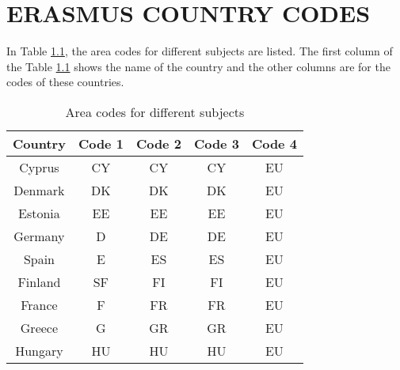 \chapter{ERASMUS COUNTRY CODES}

In Table \ref{tab:tableArea}, the area codes for different subjects are listed. The first column of the Table \ref{tab:tableArea} shows the name of the country and the other columns are for the codes of these countries.  
\begin{table}[!ht]
\caption{Area codes for different subjects}
\label{tab:tableArea}

\centering
\begin{tabular}{|c|c|c|c|c|}
\hline
\textbf{Country} & \textbf{Code 1} & \textbf{Code 2} & \textbf{Code 3} & \textbf{Code 4}                                                     \\ \hline
Cyprus           & CY              & CY              & CY              & EU                                                                  \\ \hline
Denmark          & DK              & DK              & DK              & EU                                                                  \\ \hline
Estonia          & EE              & EE              & EE              & EU                                                                  \\ \hline
Germany          & D               & DE              & DE              & EU                                                                  \\ \hline
Spain            & E               & ES              & ES              & EU                                                                  \\ \hline
Finland          & SF              & FI              & FI              & EU                                                                  \\ \hline
France           & F               & FR              & FR              & EU                                                                  \\ \hline
Greece           & G               & GR              & GR              & EU                                                                  \\ \hline
Hungary          & HU              & HU              & HU              & EU                                                                  \\ \hline

\end{tabular}
\end{table}
